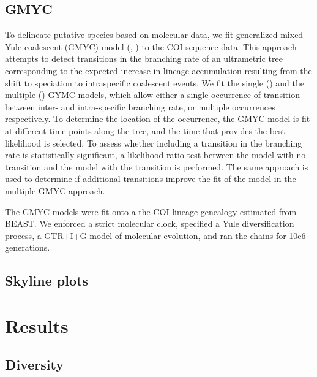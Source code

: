 \documentclass{article}
\begin{document}
\subsection{GMYC}
To delineate putative species based on molecular data, we fit generalized mixed
Yule coalescent (GMYC) model (\cite{Pons2006}, \cite{Monaghan2009a}) to the COI
sequence data. This approach attempts to detect transitions in the branching
rate of an ultrametric tree corresponding to the expected increase in lineage
accumulation resulting from the shift to speciation to intraspecific coalescent
events. We fit the single (\cite{Pons2006}) and the multiple
(\cite{Monaghan2009a}) GYMC models, which allow either a single occurrence of
transition between inter- and intra-specific branching rate, or multiple
occurrences respectively. To determine the location of the occurrence, the GMYC
model is fit at different time points along the tree, and the time that provides
the best likelihood is selected. To assess whether including a transition in the
branching rate is statistically significant, a likelihood ratio test between the
model with no transition and the model with the transition is performed. The
same approach is used to determine if additional transitions improve the fit of
the model in the multiple GMYC approach.

The GMYC models were fit onto a the COI lineage genealogy estimated from
BEAST. We enforced a strict molecular clock, specified a Yule diversification
process, a GTR+I+G model of molecular evolution, and ran the chains for 10e6
generations. 



\subsection{Skyline plots}



\section{Results}

\subsection{Diversity}
\end{document}
